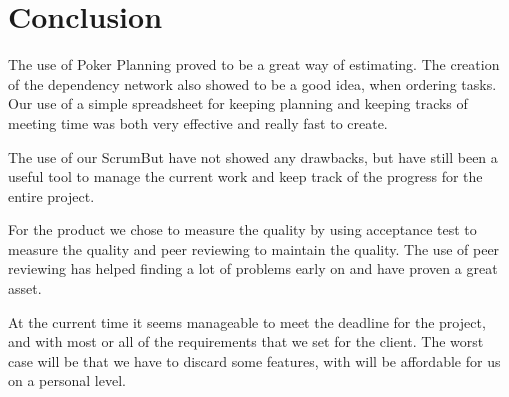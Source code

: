\section{Conclusion}


The use of Poker Planning proved to be a great way of estimating. The creation of the dependency network also showed to be a good idea, when ordering tasks.
Our use of a simple spreadsheet for keeping planning and keeping tracks of meeting time was both very effective and really fast to create.

The use of our ScrumBut have not showed any drawbacks, but have still been a useful tool to manage the current work and keep track of the progress for the entire project.

For the product we chose to measure the quality by using acceptance test to measure the quality and peer reviewing to maintain the quality.
The use of peer reviewing has helped finding a lot of problems early on and have proven a great asset.

At the current time it seems manageable to meet the deadline for the project, and with most or all of the requirements that we set for the client. The worst case will be that we have to discard some features, with will be affordable for us on a personal level. 
\newpage